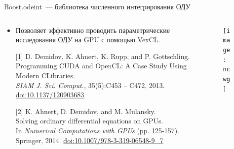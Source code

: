 \documentclass[@BEAMER_OPTIONS@]{beamer}
\newcommand{\CXX}{{\rm C}\plusplus}
\begin{document}
\begin{frame}{Boost.odeint~--- библиотека численного интегрирования ОДУ}
    \begin{columns}
        \begin{column}{0.65\textwidth}
            \begin{itemize}
                \item Позволяет эффективно проводить параметрические
                    исследования ОДУ на GPU с помощью VexCL.
                \item[{[1]}] D. Demidov, K. Ahnert, K. Rupp, and P. Gottschling.\\
                    Programming CUDA and OpenCL: A Case Study Using Modern \CXX Libraries.\\
                    \emph{SIAM J. Sci. Comput.,} 35(5):C453 – C472, 2013.\\
                    \href{http://dx.doi.org/10.1137/120903683}{doi:10.1137/120903683}
                \item[{[2]}] K. Ahnert, D. Demidov, and M. Mulansky.\\
                    Solving ordinary differential equations on GPUs.\\
                    In \emph{Numerical Computations with GPUs} (pp. 125-157).  Springer, 2014.
                    \href{http://dx.doi.org/10.1007/978-3-319-06548-9\_7}{doi:10.1007/978-3-319-06548-9\_7}
            \end{itemize}
        \end{column}
        \begin{column}{0.35\textwidth}
            \begin{figure}
                \texttt{[image: ncwg]}
            \end{figure}
        \end{column}
    \end{columns}
\end{frame}
\end{document}
